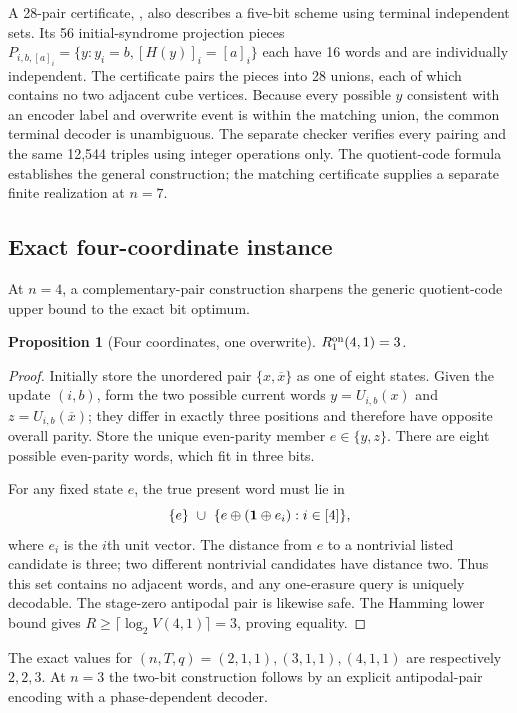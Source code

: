 \documentclass[11pt,a4paper]{article}
\newtheorem{proposition}[theorem]{Proposition}
\begin{document}
A 28-pair certificate, , also describes a five-bit scheme using terminal independent sets. Its 56 initial-syndrome projection pieces $P_{i,b,[a]_i}=\{y:y_i=b,[H(y)]_i=[a]_i\}$ each have 16 words and are individually independent. The certificate pairs the pieces into 28 unions, each of which contains no two adjacent cube vertices. Because every possible $y$ consistent with an encoder label and overwrite event is within the matching union, the common terminal decoder is unambiguous. The separate checker  verifies every pairing and the same 12,544 triples using integer operations only. The quotient-code formula establishes the general construction; the matching certificate supplies a separate finite realization at $n=7$.

\subsection{Exact four-coordinate instance}
At $n=4$, a complementary-pair construction sharpens the generic quotient-code upper bound to the exact bit optimum.
\begin{proposition}[Four coordinates, one overwrite]\label{prop:n4}
$R_1^{\rm on}(4,1)=3$.
\end{proposition}
\begin{proof}
Initially store the unordered pair $\{x,\overline x\}$ as one of eight states. Given the update $(i,b)$, form the two possible current words $y=U_{i,b}(x)$ and $z=U_{i,b}(\overline x)$; they differ in exactly three positions and therefore have opposite overall parity. Store the unique even-parity member $e\in\{y,z\}$. There are eight possible even-parity words, which fit in three bits.

For any fixed state $e$, the true present word must lie in
\[
 \{e\}\ \cup\ \{e\oplus({\bf 1}\oplus e_i):i\in[4]\},
\]
where $e_i$ is the $i$th unit vector. The distance from $e$ to a nontrivial listed candidate is three; two different nontrivial candidates have distance two. Thus this set contains no adjacent words, and any one-erasure query is uniquely decodable. The stage-zero antipodal pair is likewise safe. The Hamming lower bound gives $R\ge\lceil\log_2 V(4,1)\rceil=3$, proving equality.
\end{proof}

The exact values for $(n,T,q)=(2,1,1),(3,1,1),(4,1,1)$ are respectively $2,2,3$. At $n=3$ the two-bit construction follows by an explicit antipodal-pair encoding with a phase-dependent decoder.
\end{document}
